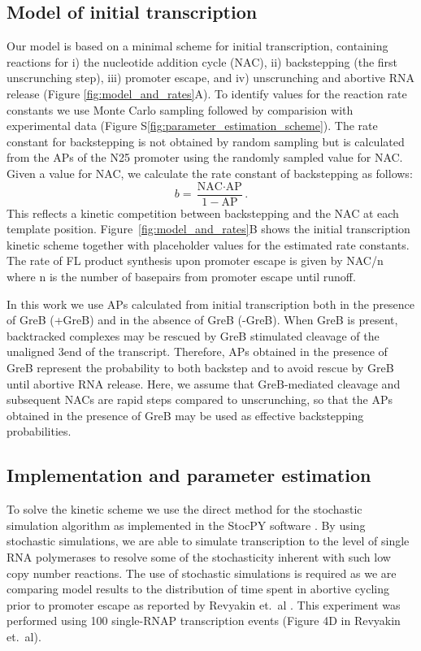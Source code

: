 %
\subsection{Model of initial transcription}
Our model is based on a minimal scheme for initial transcription, containing
reactions for i) the nucleotide addition cycle (NAC), ii) backstepping (the
first unscrunching step), iii) promoter escape, and iv) unscrunching and
abortive RNA release (Figure \ref{fig:model_and_rates}A). To identify values
for the reaction rate constants we use Monte Carlo sampling followed by
comparision with experimental data (Figure
S\ref{fig:parameter_estimation_scheme}). The rate constant for backstepping is
not obtained by random sampling but is calculated from the APs of the N25
promoter using the randomly sampled value for NAC. Given a value for NAC, we
calculate the rate constant of backstepping as follows:
\begin{equation*}
  b = \frac{\text{NAC}\cdot\text{AP}}{1-\text{AP}}.
\end{equation*}
This reflects a kinetic competition between backstepping and the NAC at each
template position. Figure~\ref{fig:model_and_rates}B shows the initial
transcription kinetic scheme together with placeholder values for the
estimated rate constants. The rate of FL product synthesis upon promoter
escape is given by NAC/n where n is the number of basepairs from promoter
escape until runoff.

In this work we use APs calculated from initial transcription both in the
presence of GreB (+GreB) and in the absence of GreB (-GreB). When GreB is
present, backtracked complexes may be rescued by GreB stimulated cleavage of
the unaligned 3\ppp end of the transcript. Therefore, APs obtained in the
presence of GreB represent the probability to both backstep and to avoid
rescue by GreB until abortive RNA release. Here, we assume that GreB-mediated
cleavage and subsequent NACs are rapid steps compared to unscrunching, so that
the APs obtained in the presence of GreB may be used as effective backstepping
probabilities.

\subsection{Implementation and parameter estimation}
To solve the kinetic scheme we use the direct method for the stochastic
simulation algorithm \cite{gillespie_exact_1977} as implemented in the StocPY
software \cite{maarleveld_stochpy:_2013}. By using stochastic simulations, we
are able to simulate transcription to the level of single RNA polymerases to
resolve some of the stochasticity inherent with such low copy number
reactions. The use of stochastic simulations is required as we are comparing
model results to the distribution of time spent in abortive cycling prior to
promoter escape as reported by Revyakin et.\ al \cite{revyakin_abortive_2006}.
This experiment was performed using 100 single-RNAP transcription events
(Figure 4D in Revyakin et.\ al).

